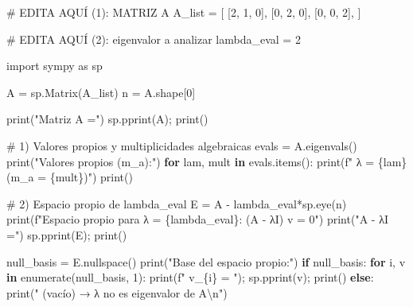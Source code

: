 \documentclass[
  letterpaper,
  DIV=11,
  numbers=noendperiod]{scrreprt}
\newenvironment{Shaded}{\begin{snugshade}}{\end{snugshade}}
\newcommand{\BuiltInTok}[1]{\textcolor[rgb]{0.00,0.23,0.31}{#1}}
\newcommand{\CharTok}[1]{\textcolor[rgb]{0.13,0.47,0.30}{#1}}
\newcommand{\CommentTok}[1]{\textcolor[rgb]{0.37,0.37,0.37}{#1}}
\newcommand{\ControlFlowTok}[1]{\textcolor[rgb]{0.00,0.23,0.31}{\textbf{#1}}}
\newcommand{\DecValTok}[1]{\textcolor[rgb]{0.68,0.00,0.00}{#1}}
\newcommand{\ImportTok}[1]{\textcolor[rgb]{0.00,0.46,0.62}{#1}}
\newcommand{\KeywordTok}[1]{\textcolor[rgb]{0.00,0.23,0.31}{\textbf{#1}}}
\newcommand{\NormalTok}[1]{\textcolor[rgb]{0.00,0.23,0.31}{#1}}
\newcommand{\OperatorTok}[1]{\textcolor[rgb]{0.37,0.37,0.37}{#1}}
\newcommand{\SpecialCharTok}[1]{\textcolor[rgb]{0.37,0.37,0.37}{#1}}
\newcommand{\SpecialStringTok}[1]{\textcolor[rgb]{0.13,0.47,0.30}{#1}}
\newcommand{\StringTok}[1]{\textcolor[rgb]{0.13,0.47,0.30}{#1}}
\begin{document}
\begin{Shaded}
\begin{Highlighting}[]
\CommentTok{\# EDITA AQUÍ (1): MATRIZ A}
\NormalTok{A\_list }\OperatorTok{=}\NormalTok{ [}
\NormalTok{    [}\DecValTok{2}\NormalTok{, }\DecValTok{1}\NormalTok{, }\DecValTok{0}\NormalTok{],}
\NormalTok{    [}\DecValTok{0}\NormalTok{, }\DecValTok{2}\NormalTok{, }\DecValTok{0}\NormalTok{],}
\NormalTok{    [}\DecValTok{0}\NormalTok{, }\DecValTok{0}\NormalTok{, }\DecValTok{2}\NormalTok{],}
\NormalTok{]}

\CommentTok{\# EDITA AQUÍ (2): eigenvalor a analizar}
\NormalTok{lambda\_eval }\OperatorTok{=} \DecValTok{2}

\ImportTok{import}\NormalTok{ sympy }\ImportTok{as}\NormalTok{ sp}

\NormalTok{A }\OperatorTok{=}\NormalTok{ sp.Matrix(A\_list)}
\NormalTok{n }\OperatorTok{=}\NormalTok{ A.shape[}\DecValTok{0}\NormalTok{]}

\BuiltInTok{print}\NormalTok{(}\StringTok{"Matriz A ="}\NormalTok{)}
\NormalTok{sp.pprint(A)}\OperatorTok{;} \BuiltInTok{print}\NormalTok{()}

\CommentTok{\# 1) Valores propios y multiplicidades algebraicas}
\NormalTok{evals }\OperatorTok{=}\NormalTok{ A.eigenvals()}
\BuiltInTok{print}\NormalTok{(}\StringTok{"Valores propios (m\_a):"}\NormalTok{)}
\ControlFlowTok{for}\NormalTok{ lam, mult }\KeywordTok{in}\NormalTok{ evals.items():}
    \BuiltInTok{print}\NormalTok{(}\SpecialStringTok{f"  λ = }\SpecialCharTok{\{}\NormalTok{lam}\SpecialCharTok{\}}\SpecialStringTok{   (m\_a = }\SpecialCharTok{\{}\NormalTok{mult}\SpecialCharTok{\}}\SpecialStringTok{)"}\NormalTok{)}
\BuiltInTok{print}\NormalTok{()}

\CommentTok{\# 2) Espacio propio de lambda\_eval}
\NormalTok{E }\OperatorTok{=}\NormalTok{ A }\OperatorTok{{-}}\NormalTok{ lambda\_eval}\OperatorTok{*}\NormalTok{sp.eye(n)}
\BuiltInTok{print}\NormalTok{(}\SpecialStringTok{f"Espacio propio para λ = }\SpecialCharTok{\{}\NormalTok{lambda\_eval}\SpecialCharTok{\}}\SpecialStringTok{:  (A {-} λI) v = 0"}\NormalTok{)}
\BuiltInTok{print}\NormalTok{(}\StringTok{"A {-} λI ="}\NormalTok{)}
\NormalTok{sp.pprint(E)}\OperatorTok{;} \BuiltInTok{print}\NormalTok{()}

\NormalTok{null\_basis }\OperatorTok{=}\NormalTok{ E.nullspace()}
\BuiltInTok{print}\NormalTok{(}\StringTok{"Base del espacio propio:"}\NormalTok{)}
\ControlFlowTok{if}\NormalTok{ null\_basis:}
    \ControlFlowTok{for}\NormalTok{ i, v }\KeywordTok{in} \BuiltInTok{enumerate}\NormalTok{(null\_basis, }\DecValTok{1}\NormalTok{):}
        \BuiltInTok{print}\NormalTok{(}\SpecialStringTok{f"  v\_}\SpecialCharTok{\{}\NormalTok{i}\SpecialCharTok{\}}\SpecialStringTok{ = "}\NormalTok{)}\OperatorTok{;}\NormalTok{ sp.pprint(v)}\OperatorTok{;} \BuiltInTok{print}\NormalTok{()}
\ControlFlowTok{else}\NormalTok{:}
    \BuiltInTok{print}\NormalTok{(}\StringTok{"  (vacío) → λ no es eigenvalor de A}\CharTok{\textbackslash{}n}\StringTok{"}\NormalTok{)}


\end{Highlighting}
\end{Shaded}
\end{document}
